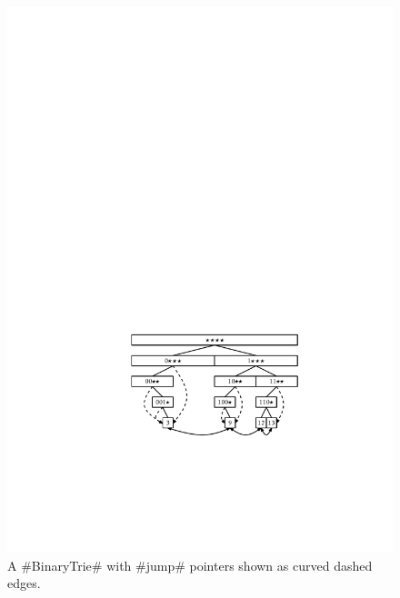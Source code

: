 \begin{figure}
  \begin{center}
    \includegraphics[width=\ScaleIfNeeded]{figs/binarytrie-ex-2}
  \end{center}
  \caption[A BinaryTrie]{A #BinaryTrie# with #jump# pointers shown as curved dashed
  edges.}
\end{figure}



